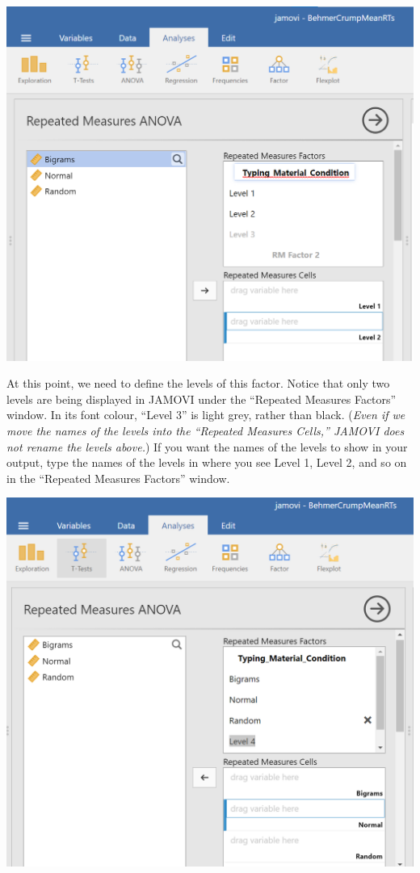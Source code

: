 \documentclass[
]{book}
\begin{document}
\includegraphics{img/RM_ANOVA_NamingTheFactor.png}

At this point, we need to define the levels of this factor. Notice that only two levels are being displayed in JAMOVI under the ``Repeated Measures Factors'' window. In its font colour, ``Level 3'' is light grey, rather than black. (\emph{Even if we move the names of the levels into the ``Repeated Measures Cells,'' JAMOVI does not rename the levels above.}) If you want the names of the levels to show in your output, type the names of the levels in where you see Level 1, Level 2, and so on in the ``Repeated Measures Factors'' window.

\includegraphics{img/RM_ANOVA_NamingTheLevels.png}
\end{document}

